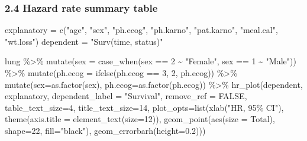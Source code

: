 \documentclass[
]{article}
\newenvironment{Shaded}{\begin{snugshade}}{\end{snugshade}}
\newcommand{\AttributeTok}[1]{\textcolor[rgb]{0.77,0.63,0.00}{#1}}
\newcommand{\ConstantTok}[1]{\textcolor[rgb]{0.00,0.00,0.00}{#1}}
\newcommand{\DecValTok}[1]{\textcolor[rgb]{0.00,0.00,0.81}{#1}}
\newcommand{\FloatTok}[1]{\textcolor[rgb]{0.00,0.00,0.81}{#1}}
\newcommand{\FunctionTok}[1]{\textcolor[rgb]{0.00,0.00,0.00}{#1}}
\newcommand{\NormalTok}[1]{#1}
\newcommand{\OtherTok}[1]{\textcolor[rgb]{0.56,0.35,0.01}{#1}}
\newcommand{\SpecialCharTok}[1]{\textcolor[rgb]{0.00,0.00,0.00}{#1}}
\newcommand{\StringTok}[1]{\textcolor[rgb]{0.31,0.60,0.02}{#1}}
\begin{document}
\hypertarget{hazard-rate-summary-table}{%
\subsubsection{2.4 Hazard rate summary
table}\label{hazard-rate-summary-table}}

\begin{Shaded}
\begin{Highlighting}[]
\NormalTok{explanatory }\OtherTok{=} \FunctionTok{c}\NormalTok{(}\StringTok{"age"}\NormalTok{, }\StringTok{"sex"}\NormalTok{, }\StringTok{"ph.ecog"}\NormalTok{, }\StringTok{"ph.karno"}\NormalTok{, }\StringTok{"pat.karno"}\NormalTok{, }\StringTok{"meal.cal"}\NormalTok{, }\StringTok{"wt.loss"}\NormalTok{)}
\NormalTok{dependent }\OtherTok{=} \StringTok{"Surv(time, status)"}

\NormalTok{lung }\SpecialCharTok{\%\textgreater{}\%}
  \FunctionTok{mutate}\NormalTok{(}\AttributeTok{sex =} \FunctionTok{case\_when}\NormalTok{(sex }\SpecialCharTok{==} \DecValTok{2} \SpecialCharTok{\textasciitilde{}} \StringTok{"Female"}\NormalTok{,}
\NormalTok{                         sex }\SpecialCharTok{==} \DecValTok{1} \SpecialCharTok{\textasciitilde{}} \StringTok{"Male"}\NormalTok{)) }\SpecialCharTok{\%\textgreater{}\%}
  \FunctionTok{mutate}\NormalTok{(}\AttributeTok{ph.ecog =} \FunctionTok{ifelse}\NormalTok{(ph.ecog }\SpecialCharTok{==} \DecValTok{3}\NormalTok{, }\DecValTok{2}\NormalTok{, ph.ecog)) }\SpecialCharTok{\%\textgreater{}\%}
  \FunctionTok{mutate}\NormalTok{(}\AttributeTok{sex=}\FunctionTok{as.factor}\NormalTok{(sex), }
         \AttributeTok{ph.ecog=}\FunctionTok{as.factor}\NormalTok{(ph.ecog)) }\SpecialCharTok{\%\textgreater{}\%}
  \FunctionTok{hr\_plot}\NormalTok{(dependent, }
\NormalTok{          explanatory, }
          \AttributeTok{dependent\_label =} \StringTok{"Survival"}\NormalTok{,}
          \AttributeTok{remove\_ref =} \ConstantTok{FALSE}\NormalTok{,}
          \AttributeTok{table\_text\_size=}\DecValTok{4}\NormalTok{, }\AttributeTok{title\_text\_size=}\DecValTok{14}\NormalTok{,}
          \AttributeTok{plot\_opts=}\FunctionTok{list}\NormalTok{(}\FunctionTok{xlab}\NormalTok{(}\StringTok{"HR, 95\% CI"}\NormalTok{), }
                         \FunctionTok{theme}\NormalTok{(}\AttributeTok{axis.title =} \FunctionTok{element\_text}\NormalTok{(}\AttributeTok{size=}\DecValTok{12}\NormalTok{)),}
                         \FunctionTok{geom\_point}\NormalTok{(}\FunctionTok{aes}\NormalTok{(}\AttributeTok{size =}\NormalTok{ Total), }\AttributeTok{shape=}\DecValTok{22}\NormalTok{, }\AttributeTok{fill=}\StringTok{"black"}\NormalTok{),}
                         \FunctionTok{geom\_errorbarh}\NormalTok{(}\AttributeTok{height=}\FloatTok{0.2}\NormalTok{)))}
\end{Highlighting}
\end{Shaded}
\end{document}
